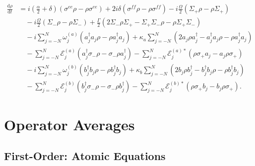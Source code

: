 \documentclass{article}
\newcommand{\ddt}[1][]{\frac{\mathrm{d} #1}{\mathrm{d}t}}
\begin{document}
\begin{align}
	\ddt[\rho] &= i \left( \frac{\alpha}{2} + \delta \right) \left( \sigma^{ee} \rho - \rho \sigma^{ee} \right) + 2 i \delta \left( \sigma^{ff} \rho - \rho \sigma^{ff} \right) - i \frac{\Omega}{2} \left( \Sigma_{+} \rho - \rho \Sigma_{+} \right) \nonumber \\
	&\quad  - i \frac{\Omega}{2} \left(\Sigma_{-} \rho - \rho \Sigma_{-}\right) + \frac{\Gamma}{2} \left( 2\Sigma_{-} \rho \Sigma_{+} - \Sigma_{+} \Sigma_{-} \rho - \rho \Sigma_{+} \Sigma_{-} \right) \nonumber \\
	&\quad -i \sum_{j=-N}^{N} \omega_{j}^{(a)} \left( a^{\dagger}_{j} a_{j} \rho - \rho a^{\dagger}_{j} a_{j} \right) + \kappa_{a} \sum_{j=-N}^{N} \left( 2 a_{j} \rho a^{\dagger}_{j} - a^{\dagger}_{j} a_{j} \rho - \rho a^{\dagger}_{j} a_{j} \right) \nonumber \\
	&\quad - \sum_{j=-N}^{N} \mathcal{E}_{j}^{(a)} \left( a^{\dagger}_{j} \sigma_{-} \rho - \sigma_{-} \rho a^{\dagger}_{j} \right) - \sum_{j=-N}^{N} \mathcal{E}_{j}^{(a) *} \left( \rho \sigma_{+} a_{j} - a_{j} \rho \sigma_{+} \right) \nonumber \\
	&\quad -i \sum_{j=-N}^{N} \omega_{j}^{(b)} \left( b^{\dagger}_{j} b_{j} \rho - \rho b^{\dagger}_{j} b_{j} \right) + \kappa_{b} \sum_{j=-N}^{N} \left( 2 b_{j} \rho b^{\dagger}_{j} - b^{\dagger}_{j} b_{j} \rho - \rho b^{\dagger}_{j} b_{j} \right) \nonumber \\
	&\quad - \sum_{j=-N}^{N} \mathcal{E}_{j}^{(b)} \left( b^{\dagger}_{j} \sigma_{-} \rho - \sigma_{-} \rho b^{\dagger}_{j} \right) - \sum_{j=-N}^{N} \mathcal{E}_{j}^{(b) *} \left( \rho \sigma_{+} b_{j} - b_{j} \rho \sigma_{+} \right) .
\end{align}

\section{Operator Averages}

\subsection{First-Order: Atomic Equations}
\end{document}

